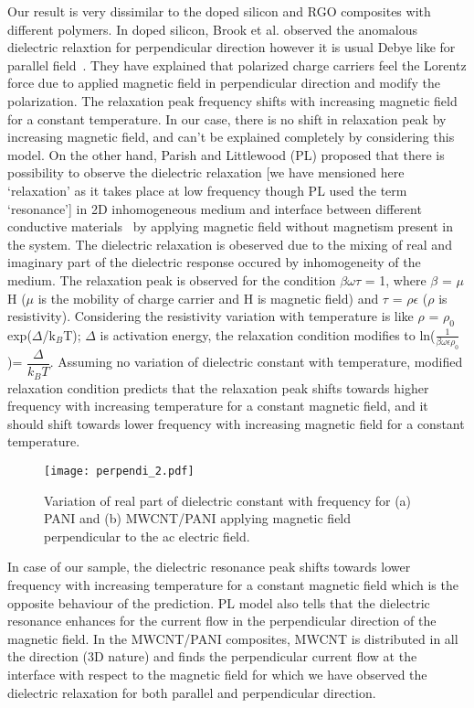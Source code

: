 \documentclass[journal=jaccck,manuscript=article]{achemso}
\begin{document}
Our result is very dissimilar to the doped silicon and RGO composites with different polymers. In doped silicon, Brook et al. observed the anomalous dielectric relaxtion for perpendicular direction however it is usual Debye like for parallel field~\cite{PhysRevB.78.045205Brook}. They have explained that polarized charge carriers feel the Lorentz force due to applied magnetic field in perpendicular direction and modify the polarization. The relaxation peak frequency shifts with increasing magnetic field for a constant temperature. In our case, there is no shift in relaxation peak by increasing magnetic field, and can't be explained completely by considering this model. On the other hand, Parish and Littlewood (PL) proposed that there is possibility to observe the dielectric relaxation [we have mensioned here `relaxation' as it takes place at low frequency though PL used the term `resonance'] in 2D inhomogeneous medium and interface between different conductive materials~\cite{doi:10.1098/rsta.2012.0452M_Parish,PhysRevLett.101.166602Parish} by applying magnetic field without magnetism present in the system. The dielectric relaxation is obeserved due to the mixing of real and imaginary part of the dielectric response occured by inhomogeneity of the medium. The relaxation peak is observed for the condition $\beta\omega\tau$ = 1, where $\beta$ = $\mu$H ($\mu$ is the mobility of charge carrier and H is magnetic field) and $\tau$ = $\rho\epsilon$ ($\rho$ is resistivity). Considering the resistivity variation with temperature is like $\rho$ = $\rho_0$exp($\Delta$/k$_B$T); $\Delta$ is activation energy, the relaxation condition modifies to ln\big($\frac{1}{\beta\omega\epsilon\rho_0}$\big)= $\dfrac{\Delta}{k_BT}$. Assuming no variation of dielectric constant with temperature, modified relaxation condition predicts that the relaxation peak shifts towards higher frequency with increasing temperature for a constant magnetic field, and it should shift towards lower frequency with increasing magnetic field for a constant temperature. 
\begin{figure}[tbh!]
	\begin{center}
		\texttt{[image: perpendi\_2.pdf]}
		\small{\caption{ Variation of real part of dielectric constant with frequency for (a) PANI and (b) MWCNT/PANI applying magnetic field perpendicular to the ac electric field.  \label{fig: ac2}}}
	\end{center}
\end{figure}
In case of our sample, the dielectric resonance peak shifts towards lower frequency with increasing temperature for a constant magnetic field which is the opposite behaviour of the prediction. PL model also tells that the dielectric resonance enhances for the current flow in the perpendicular direction of the magnetic field. In the MWCNT/PANI composites, MWCNT is distributed in all the direction (3D nature) and finds the perpendicular current flow at the interface with respect to the magnetic field for which we have observed the dielectric relaxation for both parallel and perpendicular direction.
\end{document}
